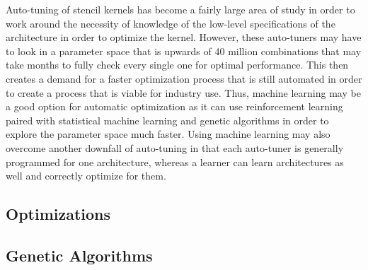 \documentclass[conference]{IEEEtran}
\newcommand {\todo}[1] {\textcolor{red}{#1}}
\begin{document}
	Auto-tuning of stencil kernels has become a fairly large area of study in order to work around the necessity of knowledge of the low-level specifications of the architecture in order to optimize the kernel. However, these auto-tuners may have to look in a parameter space that is upwards of 40 million	combinations that may take months to fully check every single one for optimal performance\cite{Datta}. This then creates a demand for a faster optimization process that is still automated in order to create a process that is viable for industry use. Thus, machine learning may be a good option for automatic optimization as it can use reinforcement learning paired with statistical machine learning and genetic algorithms in order to explore the parameter space much faster. Using machine learning may also overcome another downfall of auto-tuning in that each auto-tuner is generally programmed for one architecture, whereas a learner can learn architectures as well and correctly optimize for them.	


\subsection{Optimizations}

\subsection{Genetic Algorithms}
\end{document}

